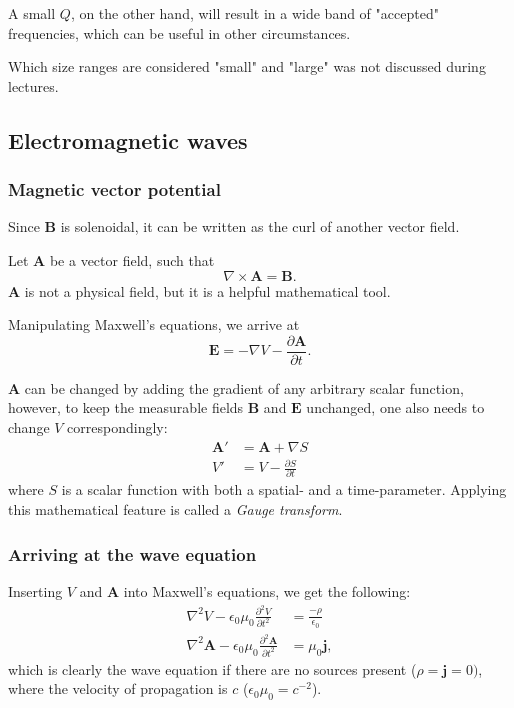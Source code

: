 \documentclass[a4paper, 12pt]{article}
\renewcommand{\vec}[1]{\bm{#1}}
\newcommand{\E}{\ensuremath{\vec{E}}}
\newcommand{\e}{\ensuremath{\epsilon_0}}
\renewcommand{\j}{\ensuremath{\vec{j}}}
\newcommand{\B}{\ensuremath{\vec{B}}}
\begin{document}
            A small $Q$, on the other hand, will result in a wide band of "accepted" frequencies, which can be useful in other circumstances.
        
            Which size ranges are considered "small" and "large" was not discussed during lectures. 

    \subsection{Electromagnetic waves}
        \subsubsection{Magnetic vector potential}
            Since \B{} is solenoidal, it can be written as the curl of another vector field. 
            
            Let $\vec{A}$ be a vector field, such that
            \begin{equation}
                \nabla \times \vec{A} = \B.
            \end{equation}
            $\vec{A}$ is not a physical field, but it is a helpful mathematical tool. 

            Manipulating Maxwell's equations, we arrive at 
            \begin{equation}
                \E = -\nabla V - \frac{\partial \vec{A}}{\partial t}.
            \end{equation}
            
            $\vec{A}$ can be changed by adding the gradient of any arbitrary scalar function, 
            however, to keep the measurable fields \B{} and \E{} unchanged, one also needs to change $V$ correspondingly:
            \begin{align*}
                \vec{A}' &= \vec{A} + \nabla S \\
                V' &= V - \frac{\partial S}{\partial t}
            \end{align*}
            where $S$ is a scalar function with both a spatial- and a time-parameter.
            Applying this mathematical feature is called a \textit{Gauge transform}.
        \subsubsection{Arriving at the wave equation}
            Inserting $V$ and $\vec{A}$ into Maxwell's equations, we get the following: 
            \begin{align*}
                \nabla^2V - \e\mu_0\frac{\partial^2V}{\partial t^2} &= \frac{-\rho}{\e}\\
                \nabla^2\vec{A} - \e\mu_0\frac{\partial^2\vec{A}}{\partial t^2} &= \mu_0\j,
            \end{align*}
            which is clearly the wave equation if there are no sources present ($\rho = \j = 0)$, 
            where the velocity of propagation is $c$ ($\e\mu_0 = c^{-2}$).
\end{document}
